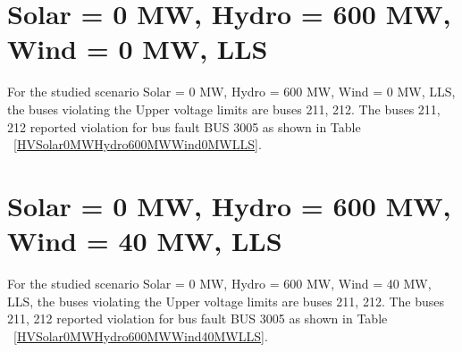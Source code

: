 \documentclass[10pt]{report}
\begin{document}
\section{Solar = 0 MW, Hydro = 600 MW, Wind = 0 MW, LLS}
For the studied scenario Solar = 0 MW, Hydro = 600 MW, Wind = 0 MW, LLS, the buses violating the Upper voltage limits are buses 211, 212.
The buses 211, 212 reported violation for bus fault BUS 3005 as shown in Table ~\ref{HVSolar0MWHydro600MWWind0MWLLS}.
\begin{table}[H]
\caption{Contingencies reporting bus voltages greater than emergency voltage of 1.1 PU for scenario Solar = 0 MW, Hydro = 600 MW, Wind = 0 MW, LLS}
\label{HVSolar0MWHydro600MWWind0MWLLS}
\centering
{}
\end{table}


\section{Solar = 0 MW, Hydro = 600 MW, Wind = 40 MW, LLS}
For the studied scenario Solar = 0 MW, Hydro = 600 MW, Wind = 40 MW, LLS, the buses violating the Upper voltage limits are buses 211, 212.
The buses 211, 212 reported violation for bus fault BUS 3005 as shown in Table ~\ref{HVSolar0MWHydro600MWWind40MWLLS}.
\begin{table}[H]
\caption{Contingencies reporting bus voltages greater than emergency voltage of 1.1 PU for scenario Solar = 0 MW, Hydro = 600 MW, Wind = 40 MW, LLS}
\label{HVSolar0MWHydro600MWWind40MWLLS}
\centering
{}
\end{table}
\end{document}
